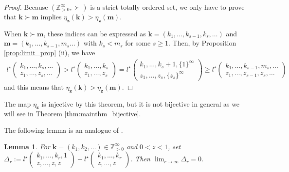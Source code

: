 \documentclass[12pt,a4paper]{article}
\newtheorem{lemma}[defi]{Lemma}
\theoremstyle{remark}
\begin{document}
\begin{proof}
Because $(\mathbb{Z}_{>0}^{\infty}, \succ)$
is a strict totally ordered set,
we only have to prove that $\boldsymbol{k} \succ \boldsymbol{m}$
implies
$\eta_{\boldsymbol{z}}(\boldsymbol{k}) >
\eta_{\boldsymbol{z}}(\boldsymbol{m})$.


When $\boldsymbol{k} \succ \boldsymbol{m}$, 
these indices can be expressed as
$\boldsymbol{k}=(k_1,\ldots, k_{s-1}, k_s, \ldots )$
and $\boldsymbol{m}=(k_1,\ldots, k_{s-1}, m_s \ldots )$
with $k_s<m_s$ for some $s\ge 1$.
Then, by Proposition 
\ref{prop:limit_prop} (ii), we have
\begin{align*}
    l^{\star}\begin{pmatrix}
k_1,\ldots, k_s, \ldots \\
z_1,\ldots ,z_s, \ldots
\end{pmatrix}
> l^{\star}\begin{pmatrix}
k_1,\ldots, k_s \\
z_1,\ldots ,z_s
\end{pmatrix}
=
l^{\star}\begin{pmatrix}
k_1,\ldots, k_s+1, \{1\}^{\infty} \\
z_1,\ldots ,z_s, \{z_s\}^{\infty} 
\end{pmatrix}
\ge 
l^{\star}\begin{pmatrix}
k_1,\ldots, k_{s-1}, m_{s},\ldots  \\
z_1,\ldots ,z_{s-1}, z_{s}, \ldots  
\end{pmatrix}
\end{align*}
and this means that 
$\eta_{\boldsymbol{z}}(\boldsymbol{k}) >
\eta_{\boldsymbol{z}}(\boldsymbol{m})$.
\end{proof}

The map $\eta_{\boldsymbol{z}}$
is injective by this theorem,
but it is not bijective in general
as we will see in Theorem \ref{thm:mainthm_bijective}.

The following lemma is an analogue of 
\cite[Lemma 3.2]{Li}.
\begin{lemma}\label{lemma:Delta_r}
For $\boldsymbol{k}=(k_1,k_2,\ldots ) \in\mathbb{Z}_{>0}^{\infty}$
and $0<z<1$,
set $ \Delta_r:= 
l^{\star}\begin{pmatrix}
k_1,\ldots, k_r,1\\
z, \ldots , z, z
\end{pmatrix}
-
l^{\star}\begin{pmatrix}
k_1,\ldots, k_r\\
z, \ldots , z
\end{pmatrix}$.
Then $\displaystyle\lim_{r\to\infty} \Delta_r =0$.
\end{lemma}
\end{document}
